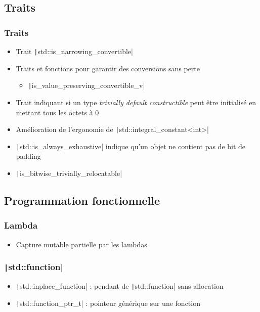 \documentclass[C++.tex]{subfiles}
\begin{document}
\subsection*{Traits}
\begin{frame}[fragile]
	\frametitle{Traits}
	\begin{itemize}
		\item Trait \texttt|std::is_narrowing_convertible|
		\item Traits et fonctions pour garantir des conversions sans perte
		\begin{itemize}
			\item \texttt|is_value_preserving_convertible_v|
		\end{itemize}
		\item Trait indiquant si un type \textit{trivially default constructible} peut être initialisé en mettant tous les octets à 0
		\item Amélioration de l'ergonomie de \texttt|std::integral_constant<int>|
		\item \texttt|std::is_always_exhaustive| indique qu'un objet ne contient pas de bit de padding
		\item \texttt|is_bitwise_trivially_relocatable|
	\end{itemize}

\end{frame}

\subsection*{Programmation fonctionnelle}
\begin{frame}[fragile]
	\frametitle{Lambda}
	\begin{itemize}
		\item Capture mutable partielle par les lambdas
	\end{itemize}
\end{frame}

\begin{frame}[fragile]
	\frametitle{\texttt|std::function|}
	\begin{itemize}
		\item \texttt|std::inplace_function| : pendant de \texttt|std::function| sans allocation
		\item \texttt|std::function_ptr_t| : pointeur générique sur une fonction
	\end{itemize}

\end{frame}
\end{document}
